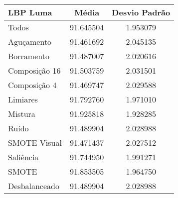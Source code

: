 
\begin{table}[!htbp]
\centering
\caption{}
\label{tab:resultados:x:melhor}
\begin{tabular}{|l|c|c|}
\hline
\textbf{LBP Luma} & \textbf{Média}     & \textbf{Desvio Padrão} \\ \hline
   Todos        &  91.645504 &  1.953079  \\ \hline
  Aguçamento    &  91.461692 &  2.045135  \\ \hline
  Borramento    &  91.487007 &  2.020616  \\ \hline
  Composição 16 &  91.503759 &  2.031501  \\ \hline
  Composição 4  &  91.469747 &  2.029588  \\ \hline
  Limiares      &  91.792760 &  1.971010  \\ \hline
  Mistura       &  91.925818 &  1.928285  \\ \hline
  Ruído         &  91.489904 &  2.028988  \\ \hline
  SMOTE Visual  &  91.471437 &  2.027512  \\ \hline
  Saliência     &  91.744950 &  1.991271  \\ \hline
 SMOTE          &  91.853505 &  1.964750  \\ \hline
Desbalanceado   &  91.489904 &  2.028988  \\ \hline
\end{tabular}
\end{table}



